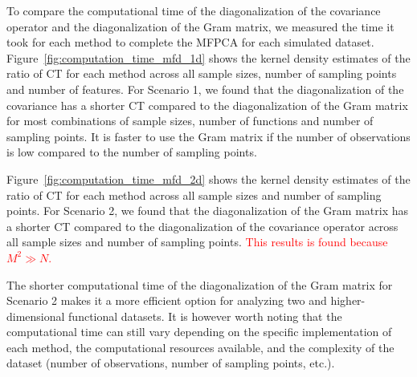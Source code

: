 \begin{results}
To compare the computational time of the diagonalization of the covariance operator and the diagonalization of the Gram matrix, we measured the time it took for each method to complete the MFPCA for each simulated dataset.
Figure~\ref{fig:computation_time_mfd_1d} shows the kernel density estimates of the ratio of CT for each method across all sample sizes, number of sampling points and number of features. For Scenario 1, we found that the diagonalization of the covariance has a shorter CT compared to the diagonalization of the Gram matrix for most combinations of sample sizes, number of functions and number of sampling points. It is faster to use the Gram matrix if the number of observations is low compared to the number of sampling points.

Figure~\ref{fig:computation_time_mfd_2d} shows the kernel density estimates of the ratio of CT for each method across all sample sizes and number of sampling points. For Scenario 2, we found that the diagonalization of the Gram matrix has a shorter CT compared to the diagonalization of the covariance operator across all sample sizes and number of sampling points. \textcolor{red}{This results is found because $M^2 \gg N$.}

The shorter computational time of the diagonalization of the Gram matrix for  Scenario 2 makes it a more efficient option for analyzing two and higher-dimensional functional datasets. It is however worth noting that the computational time can still vary depending on the specific implementation of each method, the computational resources available, and the complexity of the dataset (number of observations, number of sampling points, etc.).
\end{results}

